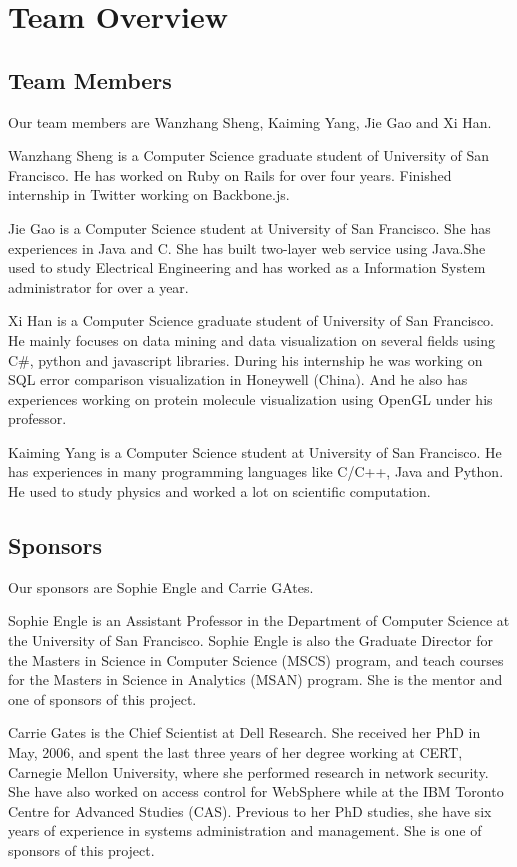 \documentclass[paper=a4, fontsize=11pt]{report} %
\begin{document}
\section{Team Overview} %
\label{sec:team_ovierview}

\subsection{Team Members} %
\label{sub:team_members}
Our team members are Wanzhang Sheng, Kaiming Yang, Jie Gao and Xi Han.

Wanzhang Sheng is a Computer Science graduate student of University of San Francisco. He has worked on Ruby on Rails for over four years. Finished internship in Twitter working on Backbone.js.

Jie Gao is a Computer Science student at University of San Francisco. She has experiences in Java and C. She has built two-layer web service using Java.She used to study Electrical Engineering and has worked as a Information System administrator for over a year.

Xi Han is a Computer Science graduate student of University of San Francisco. He mainly focuses on data mining and data visualization on several fields using C\#, python and javascript libraries. During his internship he was working on SQL error comparison visualization in Honeywell (China). And he also has experiences working on protein molecule visualization using OpenGL under his professor.

Kaiming Yang is a Computer Science student at University of San Francisco. He has experiences in many programming languages like C/C++, Java and Python. He used to study physics and worked a lot on scientific computation.

\subsection{Sponsors} %
\label{sub:sponsors}
Our sponsors are Sophie Engle and Carrie GAtes.

Sophie Engle is an Assistant Professor in the Department of Computer Science at the University of San Francisco. Sophie Engle is also the Graduate Director for the Masters in Science in Computer Science (MSCS) program, and teach courses for the Masters in Science in Analytics (MSAN) program. She is the mentor and one of sponsors of this project.

Carrie Gates is the Chief Scientist at Dell Research. She received her PhD in May, 2006, and spent the last three years of her degree working at CERT, Carnegie Mellon University, where she performed research in network security. She have also worked on access control for WebSphere while at the IBM Toronto Centre for Advanced Studies (CAS). Previous to her PhD studies, she have six years of experience in systems administration and management. She is one of sponsors of this project.
\end{document}
